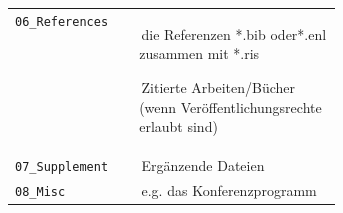 {\begin{minipage}{\dimexpr\linewidth-2\fboxrule\relax}
\begin{tabularx}{\linewidth}{
				>{\raggedright\arraybackslash}p{0.38\linewidth}
				>{\raggedright\arraybackslash}X
			}
			\texttt{06\_References} &
			\,\tabitem die Referenzen *.bib oder*.enl zusammen mit *.ris
			\par\smallskip
			\,\tabitem Zitierte Arbeiten/Bücher (wenn Veröffentlichungsrechte
			erlaubt sind) \\
			
			\texttt{07\_Supplement} &
			\,\tabitem Ergänzende Dateien \\
			
			\texttt{08\_Misc} &
			\,\tabitem e.g. das Konferenzprogramm \\
			
		\end{tabularx}
		
	\end{minipage}%
}

\endgroup
